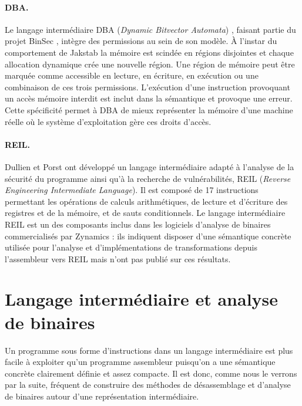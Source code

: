 \paragraph{DBA.}
Le langage intermédiaire DBA (\emph{Dynamic Bitvector Automata}) \cite{bincoa}, faisant partie du projet BinSec \cite{binsec}, intègre des permissions au sein de son modèle. À l'instar du comportement de Jakstab la mémoire est scindée en régions disjointes et chaque allocation dynamique crée une nouvelle région.
Une région de mémoire peut être marquée comme accessible en lecture, en écriture, en exécution ou une combinaison de ces trois permissions.
L'exécution d'une instruction provoquant un accès mémoire interdit est inclut dans la sémantique et provoque une erreur.
Cette spécificité permet à DBA de mieux représenter la mémoire d'une machine réelle où le système d'exploitation gère ces droits d'accès.

\paragraph{REIL.} Dullien et Porst \cite{reil} ont développé un langage intermédiaire adapté à l'analyse de la sécurité du programme ainsi qu'à la recherche de vulnérabilités, REIL (\emph{Reverse Engineering Intermediate Language}). Il est composé de 17 instructions permettant les opérations de calculs arithmétiques, de lecture et d'écriture des registres et de la mémoire, et de sauts conditionnels.
Le langage intermédiaire REIL est un des composants inclus dans les logiciels d'analyse de binaires commercialisés par Zynamics \cite{binnavi,bindiff} : ils indiquent disposer d'une sémantique concrète utilisée pour l'analyse et d'implémentations de transformations depuis l'assembleur vers REIL mais n'ont pas publié sur ces résultats.




\section{Langage intermédiaire et analyse de binaires}
Un programme sous forme d'instructions dans un langage intermédiaire est plus facile à exploiter qu'un programme assembleur puisqu'on a une sémantique concrète clairement définie et assez compacte.
Il est donc, comme nous le verrons par la suite, fréquent de construire des méthodes de désassemblage et d'analyse de binaires autour d'une représentation intermédiaire.


